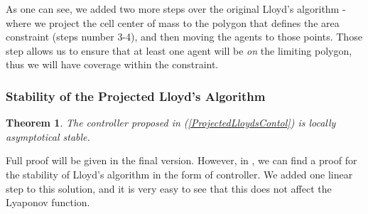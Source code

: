\documentclass{iacas}
\newtheorem{theorem}{Theorem}
\begin{document}
As one can see, we added two more steps over the original Lloyd's algorithm - where we project the cell center of mass to the polygon that defines the area constraint (steps number 3-4), and then moving the agents to those points. Those step allows us to ensure that at least one agent will be \emph{on} the limiting polygon, thus we will have coverage within the constraint.

\subsubsection{Stability of the Projected Lloyd's Algorithm}
\begin{theorem}
The controller proposed in (\ref{ProjectedLloydsContol}) is locally asymptotical stable.
\end{theorem}

Full proof will be given in the final version. However, in \cite{Cortes2004}, we can find a proof for the stability of Lloyd's algorithm in the form of controller. We added one linear step to this solution, and it is very easy to see that this does not affect the Lyaponov function.

\end{document}
